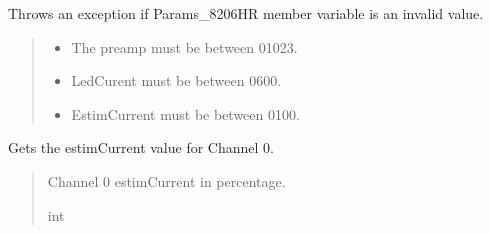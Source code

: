 \documentclass[letterpaper,10pt,english]{sphinxmanual}
\begin{document}
\begin{fulllineitems}
\begin{fulllineitems}
\label{\detokenize{PodApi.Parameters:PodApi.Parameters.Params8480SC.Params8480SC._CheckParams}}
\pysigstartsignatures
{}
\pysigstopsignatures
\sphinxAtStartPar
Throws an exception if Params\_8206HR member variable is an invalid value.
\begin{quote}\begin{description}
\begin{itemize}
\item {} 
\sphinxAtStartPar
{} \textendash{} The preamp must be between 0\sphinxhyphen{}1023.

\item {} 
\sphinxAtStartPar
{} \textendash{} Led\sphinxhyphen{}Curent must be between 0\sphinxhyphen{}600.

\item {} 
\sphinxAtStartPar
{} \textendash{} Estim\sphinxhyphen{}Current must be between 0\sphinxhyphen{}100.

\end{itemize}

\end{description}\end{quote}

\end{fulllineitems}


\begin{fulllineitems}
\label{\detokenize{PodApi.Parameters:PodApi.Parameters.Params8480SC.Params8480SC.estimCurrent_CH0}}
\pysigstartsignatures
{}
\pysigstopsignatures
\sphinxAtStartPar
Gets the estimCurrent value for Channel 0.
\begin{quote}\begin{description}
\sphinxAtStartPar
Channel 0 estimCurrent in percentage.

\sphinxAtStartPar
int

\end{description}\end{quote}


\end{fulllineitems}
\end{fulllineitems}
\end{document}
